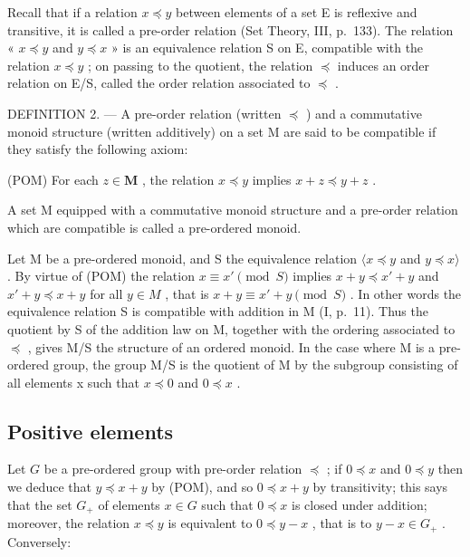 Recall that if a relation \(x \preccurlyeq y\) between elements of a set E is reflexive and transitive, it is called a pre-order relation (Set Theory, III, p.~133). The relation « \(x \preccurlyeq y\) and \(y \preccurlyeq x\) » is an equivalence relation S on E, compatible with the relation \(x \preccurlyeq y\) ; on passing to the quotient, the relation \(\preccurlyeq\) induces an order relation on E/S, called the order relation associated to \(\preccurlyeq\) .

DEFINITION 2. --- A pre-order relation (written \(\preccurlyeq\) ) and a commutative monoid structure (written additively) on a set M are said to be compatible if they satisfy the following axiom:

(POM) For each \(z \in \mathbf{M}\) , the relation \(x \preccurlyeq y\) implies \(x + z \preccurlyeq y + z\) .

A set M equipped with a commutative monoid structure and a pre-order relation which are compatible is called a pre-ordered monoid.

Let M be a pre-ordered monoid, and S the equivalence relation \(\langle x \preccurlyeq y\) and \(y \preccurlyeq x \rangle\) . By virtue of (POM) the relation \(x \equiv x' \pmod{S}\) implies \(x + y \preccurlyeq x' + y\) and \(x' + y \preccurlyeq x + y\) for all \(y \in M\) , that is \(x + y \equiv x' + y \pmod{S}\) . In other words the equivalence relation S is compatible with addition in M (I, p.~11). Thus the quotient by S of the addition law on M, together with the ordering associated to \(\preccurlyeq\) , gives M/S the structure of an ordered monoid. In the case where M is a pre-ordered group, the group M/S is the quotient of M by the subgroup consisting of all elements x such that \(x \preccurlyeq 0\) and \(0 \preccurlyeq x\) .

\subsection{Positive elements}

Let \(G\) be a pre-ordered group with pre-order relation \(\preccurlyeq\) ; if \(0 \preccurlyeq x\) and \(0 \preccurlyeq y\) then we deduce that \(y \preccurlyeq x + y\) by (POM), and so \(0 \preccurlyeq x + y\) by transitivity; this says that the set \(G_{+}\) of elements \(x \in G\) such that \(0 \preccurlyeq x\) is closed under addition; moreover, the relation \(x \preccurlyeq y\) is equivalent to \(0 \preccurlyeq y - x\) , that is to \(y - x \in G_{+}\) . Conversely:

